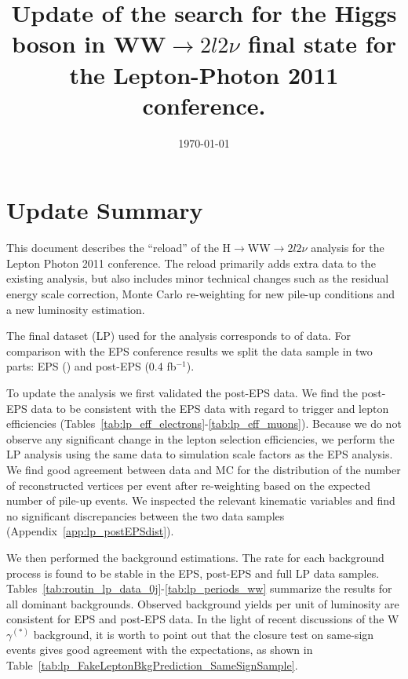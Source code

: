 \documentclass{cmspaper}
\begin{document}
\modulolinenumbers[1]
\date{\today} \title{Update of the search for the Higgs boson in WW$\to2l2\nu$ final state for the Lepton-Photon 2011 conference.}

\maketitle

\section{Update Summary}

This document describes the ``reload'' of the H$\to$WW$\to2l2\nu$
analysis for the Lepton Photon 2011 conference.  The reload primarily
adds extra data to the existing analysis, but also includes minor
technical changes such as the residual energy scale correction, Monte
Carlo re-weighting for new pile-up conditions and a new luminosity
estimation.

The final dataset (LP) used for the analysis corresponds to \lpintlumi
of data. For comparison with the EPS conference results we split the
data sample in two parts: EPS (\intlumi) and post-EPS (0.4 fb$^{-1}$).

To update the analysis we first validated the post-EPS data. We find
the post-EPS data to be consistent with the EPS data with regard to
trigger and lepton efficiencies
(Tables~\ref{tab:lp_eff_electrons}-\ref{tab:lp_eff_muons}). Because we
do not observe any significant change in the lepton selection
efficiencies, we perform the LP analysis using the same data to
simulation scale factors as the EPS analysis. We find good agreement
between data and MC for the distribution of the number of
reconstructed vertices per event after re-weighting based on the
expected number of pile-up events.  We inspected the relevant
kinematic variables and find no significant discrepancies between the
two data samples (Appendix~\ref{app:lp_postEPSdist}).

We then performed the background estimations. The rate for each
background process is found to be stable in the EPS, post-EPS and full
LP data
samples. Tables~\ref{tab:routin_lp_data_0j}-\ref{tab:lp_periods_ww}
summarize the results for all dominant backgrounds. Observed
background yields per unit of luminosity are consistent for EPS
and post-EPS data. In the light of recent discussions of the
W$\gamma^{(*)}$ background, it is worth to point out that the closure
test on same-sign events gives good agreement with the expectations,
as shown in Table~\ref{tab:lp_FakeLeptonBkgPrediction_SameSignSample}.
\end{document}
